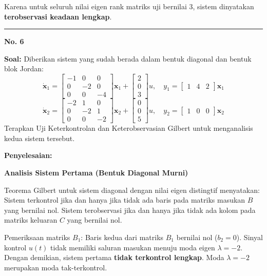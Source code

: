 \documentclass[11pt,a4paper]{article}
\begin{document}
Karena untuk seluruh nilai eigen rank matriks uji bernilai 3, sistem dinyatakan \textbf{terobservasi keadaan lengkap}.

\vspace{12pt}
\hrule
\vspace{10pt}

\textbf{\large No. 6}

\textbf{Soal:}  
Diberikan sistem yang sudah berada dalam bentuk diagonal dan bentuk blok Jordan:
$$\dot{\mathbf{x}}_1 = \begin{bmatrix} -1 & 0 & 0 \\ 0 & -2 & 0 \\ 0 & 0 & -4 \end{bmatrix} \mathbf{x}_1 + \begin{bmatrix} 2 \\ 0 \\ 3 \end{bmatrix} u, \quad y_1 = \begin{bmatrix} 1 & 4 & 2 \end{bmatrix} \mathbf{x}_1$$
$$\dot{\mathbf{x}}_2 = \begin{bmatrix} -2 & 1 & 0 \\ 0 & -2 & 1 \\ 0 & 0 & -2 \end{bmatrix} \mathbf{x}_2 + \begin{bmatrix} 0 \\ 0 \\ 5 \end{bmatrix} u, \quad y_2 = \begin{bmatrix} 1 & 0 & 0 \end{bmatrix} \mathbf{x}_2$$
Terapkan Uji Keterkontrolan dan Keterobservasian Gilbert untuk menganalisis kedua sistem tersebut.

\textbf{Penyelesaian:}

\textbf{Analisis Sistem Pertama (Bentuk Diagonal Murni)}

Teorema Gilbert untuk sistem diagonal dengan nilai eigen distingtif menyatakan:
Sistem terkontrol jika dan hanya jika tidak ada baris pada matriks masukan $B$ yang bernilai nol.
Sistem terobservasi jika dan hanya jika tidak ada kolom pada matriks keluaran $C$ yang bernilai nol.

Pemeriksaan matriks $B_1$:
Baris kedua dari matriks $B_1$ bernilai nol ($b_2 = 0$). Sinyal kontrol $u(t)$ tidak memiliki saluran masukan menuju moda eigen $\lambda = -2$. Dengan demikian, sistem pertama \textbf{tidak terkontrol lengkap}. Moda $\lambda = -2$ merupakan moda tak-terkontrol.
\end{document}
